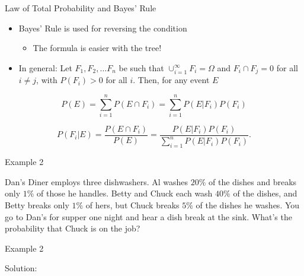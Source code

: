 \documentclass[
  ignorenonframetext,
]{beamer}
\providecommand{\tightlist}{%
  \setlength{\itemsep}{0pt}\setlength{\parskip}{0pt}}
\begin{document}
\begin{frame}{Law of Total Probability and Bayes' Rule}
\protect\hypertarget{law-of-total-probability-and-bayes-rule-1}{}
\begin{itemize}
\item
  Bayes' Rule is used for reversing the condition

  \begin{itemize}
  \tightlist
  \item
    The formula is easier with the tree!
  \end{itemize}
\item
  In general: Let \(F_1, F_2, \ldots F_n\) be such that
  \(\cup_{i=1}^{\infty} F_i=\Omega\) and \(F_i\cap F_j=0\) for all
  \(i\neq j\), with \(P(F_i)>0\) for all \(i\). Then, for any event
  \(E\)
\end{itemize}

\[P(E)=\sum_{i=1}^n P(E \cap F_i)=\sum_{i=1}^n P(E|F_i)P(F_i)\]

\[P(F_i|E)=\frac{P(E \cap F_i)}{P(E)}=\frac{P(E|F_i)P(F_i)}{\sum_{i=1}^nP(E|F_i)P(F_i)}.\]
\end{frame}

\begin{frame}{Example 2}
\protect\hypertarget{example-2}{}
\begin{tcolorbox}
Dan's Diner employs three dishwashers. Al washes $20\%$ of the dishes and breaks only $1\%$ of those he handles. Betty and Chuck each wash $40\%$ of the dishes, and Betty breaks only $1\%$ of hers, but Chuck breaks $5\%$ of the dishes he washes. You go to Dan's for supper one night and hear a dish break at the sink. What's the probability that Chuck is on the job?


\end{tcolorbox}
\end{frame}

\begin{frame}{Example 2}
\protect\hypertarget{example-2-1}{}
\begin{tcolorbox}
Solution:

\vspace{50mm}


\end{tcolorbox}
\end{frame}
\end{document}
